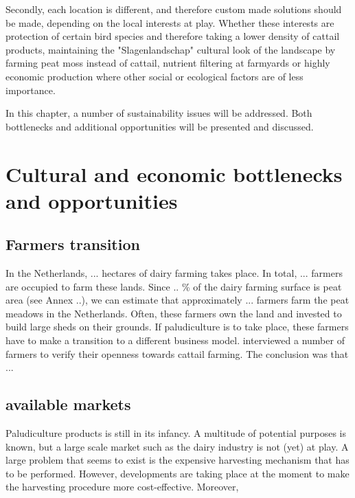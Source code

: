 \documentclass[a4paper,12pt]{scrbook}
\begin{document}
{Secondly, each location is different, and therefore custom made solutions should be made, depending on the local interests at play. Whether these interests are protection of certain bird species and therefore taking a lower density of cattail products, maintaining the "Slagenlandschap" cultural look of the landscape by farming peat moss instead of cattail, nutrient filtering at farmyards or highly economic production where other social or ecological factors are of less importance.




In this chapter, a number of sustainability issues will be addressed. Both bottlenecks and additional opportunities will be presented and discussed.

\section{Cultural and economic bottlenecks and opportunities}

\subsection{Farmers transition}
In the Netherlands, ... hectares of dairy farming takes place. In total, ... farmers are occupied to farm these lands. Since .. \% of the dairy farming surface is peat area (see Annex ..), we can estimate that approximately ... farmers farm the peat meadows in the Netherlands. Often, these farmers own the land and invested to build large sheds on their grounds. If paludiculture is to take place, these farmers have to make a transition to a different business model. \citet{sindram2017} interviewed a number of farmers to verify their openness towards cattail farming. The conclusion was that ... 

\subsection{available markets}
Paludiculture products is still in its infancy. A multitude of potential purposes is known, but a large scale market such as the dairy industry is not (yet) at play. A large problem that seems to exist is the expensive harvesting mechanism that has to  be performed. However, developments are taking place at the moment to make the harvesting procedure more cost-effective. Moreover, 


}
\end{document}
